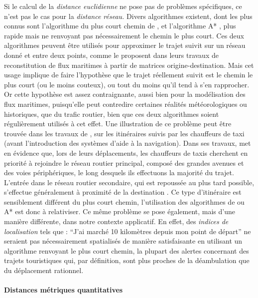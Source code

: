 Si le calcul de la \emph{distance euclidienne} ne pose pas de
problèmes spécifiques, ce n'est pas le cas pour la \emph{distance
  réseau.}  Divers algorithmes existent, dont les plus connus sont
l'algorithme du plus court chemin de \textcite{Dijkstra1959}, et
l'algorithme A* \autocite{Hart1968}, plus rapide mais ne renvoyant pas
nécessairement le chemin le plus court. Ces deux algorithmes peuvent
être utilisés pour approximer le trajet suivit sur un réseau donné et
entre deux points, comme le proposent \textcite{Berli2018, Bunel2018}
dans leurs travaux de reconstitution de flux maritimes à partir de
matrices origine-destination. Mais cet usage implique de faire
l'hypothèse que le trajet réellement suivit est le chemin le plus
court (ou le moins couteux), ou tout du moins qu'il tend à s'en
rapprocher. Or cette hypothèse est assez contraignante, aussi bien
pour la modélisation des flux maritimes, puisqu'elle peut contredire
certaines réalités météorologiques ou historiques, que du trafic
routier, bien que ces deux algorithmes soient régulièrement utilisés à
cet effet. Une illustration de ce problème peut être trouvée dans les
travaux de \textcite{Pailhous1970}, sur les itinéraires suivis par les
chauffeurs de taxi (avant l'introduction des systèmes d'aide à la
navigation). Dans ses travaux, \textcite{Pailhous1970} met en évidence
que, lors de leurs déplacements, les chauffeurs de taxis cherchent en
priorité à rejoindre le réseau routier principal, composé des grandes
avenues et des voies périphériques, le long desquels ils effectuons la
majorité du trajet. L'entrée dans le réseau routier secondaire, qui
est repoussée au plus tard possible, s'effectue généralement à
proximité de la destination \autocite{Lagesse2016}. Ce type
d'itinéraire est sensiblement différent du plus court chemin,
l'utilisation des algorithmes de \textcite{Dijkstra1959} ou A*
\autocite{Hart1968} est donc à relativiser. Ce même problème se pose
également, mais d'une manière différente, dans notre contexte
applicatif. En effet, des \emph{indices de localisation} tels que :
\enquote{J'ai marché 10 kilomètres depuis mon point de départ} ne
seraient pas nécessairement spatialisés de manière satisfaisante en
utilisant un algorithme renvoyant le plus court chemin, la plupart des
alertes concernant des trajets touristiques qui, par définition, sont
plus proches de la déambulation que du déplacement rationnel.

\paragraph{Distances métriques quantitatives}

